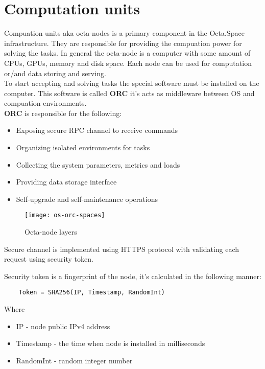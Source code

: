 \section{Computation units}

Compuation units aka octa-nodes is a primary component in the Octa.Space infrastructure.
They are responsible for providing the compuation power for solving the tasks.
In general the octa-node is a computer with some amount of CPUs, GPUs, memory and disk space.
Each node can be used for computation or/and data storing and serving.
\\

To start accepting and solving tasks the special software must be installed on the computer.
This software is called \textbf{ORC} it's acts as middleware between OS and compuation environments.
\\

\textbf{ORC} is responsible for the following:

\begin{itemize}
    \item Exposing secure RPC channel to receive commands
    \item Organizing isolated environments for tasks
    \item Collecting the system parameters, metrics and loads
    \item Providing data storage interface
    \item Self-upgrade and self-maintenance operations
\end{itemize}

\begin{figure}[h]
\centering
\texttt{[image: os-orc-spaces]}
\caption{Octa-node layers}
\end{figure}

Secure channel is implemented using HTTPS\cite{https} protocol with validating each request using security token.

Security token is a fingerprint of the node, it's calculated in the following manner:

\begin{verbatim}
    Token = SHA256(IP, Timestamp, RandomInt)
\end{verbatim}

Where

\begin{itemize}
    \item IP - node public IPv4 address
    \item Timestamp - the time when node is installed in milliseconds
    \item RandomInt - random integer number
\end{itemize}

